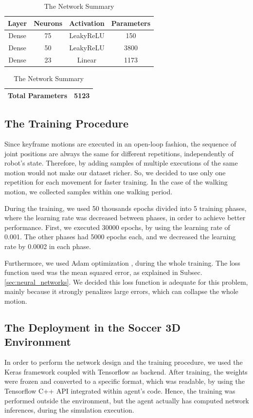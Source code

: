 \begin{table}[htbp]
\caption{The Network Summary}
\begin{center}
\begin{tabular}{|c|c|c|c|}
\hline
\textbf{Layer}&{\textbf{Neurons}}& \textbf{Activation}& \textbf{Parameters} \\
\hline
Dense & 75 & LeakyReLU & 150  \\
\hline
Dense & 50 & LeakyReLU & 3800 \\
\hline
Dense & 23 & Linear & 1173 \\
\hline
\end{tabular}
\begin{tabular}{|c|c|}
\hline
\textbf{Total Parameters} & 5123 \\
\hline
\end{tabular}
\label{tab:network_summary}
\end{center}
\end{table}


\subsection{The Training Procedure}
Since keyframe motions are executed in an open-loop fashion, the sequence of joint positions are always the same for different repetitions, independently of robot's state. Therefore, by adding samples of multiple executions of the same motion would not make our dataset richer. So, we decided to use only one repetition for each movement for faster training. In the case of the walking motion, we collected samples within one walking period.

During the training, we used 50 thousands epochs divided into 5 training phases, where the learning rate was decreased between phases, in order to achieve better performance. First, we executed 30000 epochs, by using the learning rate of 0.001. The other phases had 5000 epochs each, and we decreased the learning rate by 0.0002 in each phase.

Furthermore, we used Adam optimization \cite{adam2014}, during the whole training. The loss function used was the mean squared error, as explained in Subsec. \ref{sec:neural_networks}. We decided this loss function is adequate for this problem, mainly because it strongly penalizes large errors, which can collapse the whole motion.

\subsection{The Deployment in the Soccer 3D Environment}
In order to perform the network design and the training procedure, we used the Keras \cite{chollet2015keras} framework coupled with Tensorflow \cite{tensorflow2015-whitepaper} as backend. After training, the weights were frozen and converted to a specific format, which was readable, by using the Tensorflow C++ API integrated within agent's code. Hence, the training was performed outside the environment, but the agent actually has computed network inferences, during the simulation execution.

